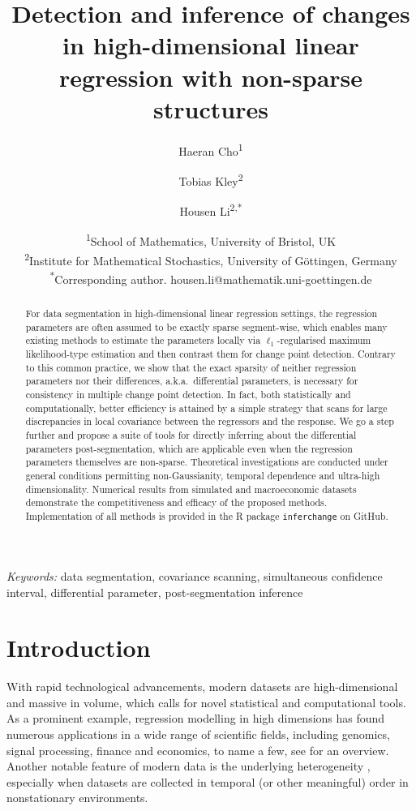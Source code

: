 \documentclass[11pt, a4paper]{article}
\title{Detection and inference of changes in high-dimensional linear regression with non-sparse structures}
\author{Haeran Cho\textsuperscript{1} \and Tobias Kley\textsuperscript{2} \and Housen Li\textsuperscript{2,*}}
\date{{\footnotesize\textsuperscript{1}School of Mathematics, University of Bristol, UK \\
 \textsuperscript{2}Institute
for Mathematical Stochastics, University of Göttingen, Germany\\
\textsuperscript{*}Corresponding author. {housen.li@mathematik.uni-goettingen.de}}}
\theoremstyle{definition}
\theoremstyle{definition}
\theoremstyle{definition}
\theoremstyle{definition}
\theoremstyle{definition}
\theoremstyle{remark}
\theoremstyle{definition}
\theoremstyle{definition}
\theoremstyle{definition}
\begin{document}
\maketitle


\begin{abstract}
For data segmentation in high-dimensional linear regression settings, the regression parameters are often assumed to be {exactly} sparse segment-wise, which enables many existing methods to estimate the parameters locally via $\ell_1$-regularised maximum likelihood-type estimation and then contrast them for change point detection. Contrary to this common practice, we show that the {exact} sparsity of neither regression parameters nor their differences, a.k.a.\ differential parameters, is necessary for consistency in multiple change point detection. In fact, both statistically and computationally, better efficiency is attained by a simple strategy that scans for large discrepancies in local covariance between the regressors and the response. We go a step further and propose a suite of tools for directly inferring about the differential parameters post-segmentation, which are applicable even when the regression parameters themselves are non-sparse. Theoretical investigations are conducted under general conditions permitting non-Gaussianity, temporal dependence and ultra-high dimensionality. Numerical results from simulated and macroeconomic datasets demonstrate the competitiveness and efficacy of the proposed methods. Implementation of all methods is provided in the R package \texttt{inferchange} on GitHub.
\end{abstract}

\noindent%
{\it Keywords:} data segmentation, covariance scanning, simultaneous confidence interval, differential parameter, post-segmentation inference


\section{Introduction}

With rapid technological advancements, modern datasets are high-dimensional and massive in volume, which calls for novel statistical and computational tools.
As a prominent example, regression modelling in high dimensions 
has found numerous applications in a wide range of scientific fields, including genomics, signal processing, finance and economics, to name a few, see \citet{buhlmann2011statistics} for an overview. 
Another notable feature of modern data is the underlying heterogeneity \citep{fan2014challenges}, especially when datasets are collected in temporal (or other meaningful) order in nonstationary environments. 
\end{document}
